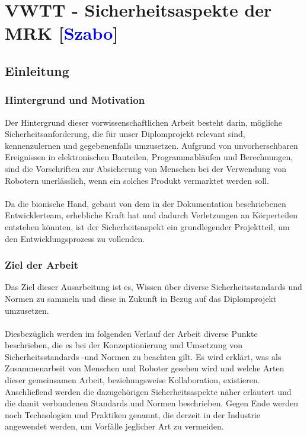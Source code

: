 \documentclass[titlepage,12pt,twoside]{article}
\begin{document}
\newpage

\section{VWTT - Sicherheitsaspekte der MRK [\textcolor{blue}{Szabo}]}
\subsection{Einleitung}
\subsubsection{Hintergrund und Motivation}
Der Hintergrund dieser vorwissenschaftlichen Arbeit besteht darin, mögliche 
Sicherheitsanforderung, die für unser Diplomprojekt relevant sind, kennenzulernen 
und gegebenenfalls umzusetzen. Aufgrund von unvorhersehbaren Ereignissen in 
elektronischen Bauteilen, Programmabläufen und Berechnungen, sind die Vorschriften 
zur Absicherung von Menschen bei der Verwendung von Robotern unerlässlich, wenn 
ein solches Produkt vermarktet werden soll. \\
\\
Da die bionische Hand, gebaut von dem in der Dokumentation beschriebenen 
Entwicklerteam, erhebliche Kraft hat und dadurch Verletzungen an Körperteilen 
entstehen könnten, ist der Sicherheitsaspekt ein grundlegender Projektteil, um 
den Entwicklungsprozess zu vollenden. \\
\subsubsection{Ziel der Arbeit}
Das Ziel dieser Ausarbeitung ist es, Wissen über diverse Sicherheitsstandards und 
Normen zu sammeln und diese in Zukunft in Bezug auf das Diplomprojekt umzusetzen. \\
\\
Diesbezüglich werden im folgenden Verlauf der Arbeit diverse Punkte beschrieben, 
die es bei der Konzeptionierung und Umsetzung von Sicherheitsstandards -und Normen 
zu beachten gilt. Es wird erklärt, was als Zusammenarbeit von Menschen und Roboter 
gesehen wird und welche Arten dieser gemeinsamen Arbeit, beziehungsweise 
Kollaboration, existieren. Anschließend werden die dazugehörigen 
Sicherheitsaspekte näher erläutert und die damit verbundenen Standards und Normen 
beschrieben. Gegen Ende werden noch Technologien und Praktiken genannt, die 
derzeit in der Industrie angewendet werden, um Vorfälle jeglicher Art zu vermeiden. \\
\end{document}
